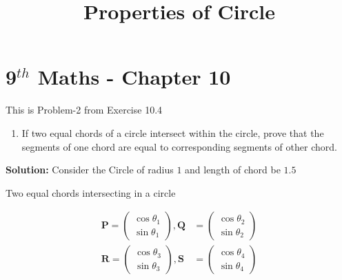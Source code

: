 \documentclass[jornel,10pt,twocolumn]{article}
\newcommand{\solution}{\noindent \textbf{Solution: }}
\newcommand{\myvec}[1]{\ensuremath{\begin{pmatrix}#1\end{pmatrix}}}
\let\vec\mathbf
\begin{document}
\begin{center}
\title{\textbf{Properties of Circle}}
\date{\vspace{-5ex}} %
\maketitle
\end{center}

\setcounter{page}{1}

\section{9$^{th}$ Maths - Chapter 10}

This is Problem-2 from Exercise 10.4

\begin{enumerate}
\item If two equal chords of a circle intersect within the circle, prove that the segments of one chord are equal to corresponding segments of other chord.
\end{enumerate}
\solution
Consider the Circle of radius $1$ and length of chord be $1.5$
\begin{table}[ht!]
	
\caption{Two equal chords intersecting in a circle}
\label{table}	
\end{table}
\begin{align}
\vec{P}=\myvec{\cos{\theta_1}\\\sin{\theta_1}},
\vec{Q}&=\myvec{\cos{\theta_2}\\\sin{\theta_2}}\\
\vec{R}=\myvec{\cos{\theta_3}\\\sin{\theta_3}},
\vec{S}&=\myvec{\cos{\theta_4}\\\sin{\theta_4}}
\end{align}
\end{document}

